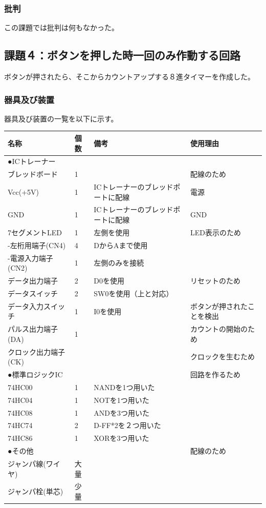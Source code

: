 \documentclass{scrartcl}
\begin{document}
\subsubsection{批判}
\label{sec:org9bfae88}
この課題では批判は何もなかった。\\

\subsection{課題４：ボタンを押した時一回のみ作動する回路}
\label{sec:orgea9e2d5}
ボタンが押されたら、そこからカウントアップする８進タイマーを作成した。\\
\subsubsection{器具及び装置}
\label{sec:orgd22d2cc}
器具及び装置の一覧を以下に示す。\\
\begin{center}
\begin{tabular}{|l|l|l|l|}
\hline
名称 & 個数 & 備考 & 使用理由\\
\hline
●ICトレーナー &  &  & \\
ブレッドボード & 1 &  & 配線のため\\
Vcc(+5V) & 1 & ICトレーナーのブレッドポートに配線 & 電源\\
GND & 1 & ICトレーナーのブレッドポートに配線 & GND\\
7セグメントLED & 1 & 左側を使用 & LED表示のため\\
-左桁用端子(CN4) & 4 & DからAまで使用 & \\
-電源入力端子(CN2) & 1 & 左側のみを接続 & \\
データ出力端子 & 2 & D0を使用 & リセットのため\\
データスイッチ & 2 & SW0を使用（上と対応） & \\
データ入力スイッチ & 1 & I0を使用 & ボタンが押されたことを検出\\
パルス出力端子(DA) & 1 &  & カウントの開始のため\\
クロック出力端子(CK) &  &  & クロックを生むため\\
\hline
●標準ロジックIC &  &  & 回路を作るため\\
74HC00 & 1 & NANDを1つ用いた & \\
74HC04 & 1 & NOTを1つ用いた & \\
74HC08 & 1 & ANDを3つ用いた & \\
74HC74 & 2 & D-FF*2を２つ用いた & \\
74HC86 & 1 & XORを3つ用いた & \\
\hline
●その他 &  &  & 配線のため\\
ジャンパ線(ワイヤ) & 大量 &  & \\
ジャンパ栓(単芯) & 少量 &  & \\
\hline
\end{tabular}
\end{center}
\end{document}
